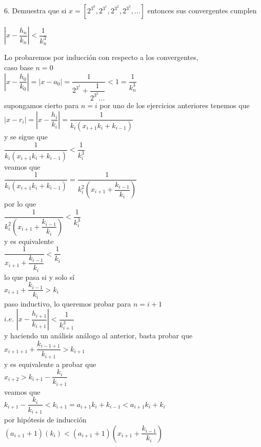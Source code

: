 \documentclass[11pt, article]{memoir}
\begin{document}
6. Demuestra que si $x=[2^{3^{0}},2^{3^{1}},2^{3^{2}},2^{3^{3}},...]$ entonces sus convergentes cumplen\\
\begin{center}
$\left|x-\dfrac{h_{n}}{k_{n}}\right|<\dfrac{1}{k_{n}^{3}}$\\
\end{center}

Lo probaremos por inducción con respecto a los convergentes,\\
caso base $n=0$\\
$\left|x-\dfrac{h_{0}}{k_{0}}\right|=\left|x-a_{0}\right|=\dfrac{1}{2^{3^{1}}+\dfrac{1}{2^{3^{2}}...}}<1=\dfrac{1}{k_{n}^{3}}$\\
supongamos cierto para $n=i$  
por uno de los ejercicios anteriores tenemos que $\left|x-r_{i}\right|=\left|x-\dfrac{h_{i}}{k_{i}}\right|=\dfrac{1}{k_{i}(x_{i+1}k_{i}+k_{i-1})}$\\
y se sigue que\\
$\dfrac{1}{k_{i}(x_{i+1}k_{i}+k_{i-1})}<\dfrac{1}{k_{i}^{3}}$\\
veamos que\\
$\dfrac{1}{k_{i}(x_{i+1}k_{i}+k_{i-1})}=\dfrac{1}{k_{i}^{2}(x_{i+1}+\dfrac{k_{i-1}}{k_{i}})}$\\
por lo que\\
$\dfrac{1}{k_{i}^{2}(x_{i+1}+\dfrac{k_{i-1}}{k_{i}})}<\dfrac{1}{k_{i}^{3}}$\\
y es equivalente\\
$\dfrac{1}{x_{i+1}+\dfrac{k_{i-1}}{k_{i}}}<\dfrac{1}{k_{i}}$\\
lo que pasa si y solo sí\\
$x_{i+1}+\dfrac{k_{i-1}}{k_{i}}>k_{i}$\\
paso inductivo, lo queremos probar para $n=i+1$\\
$i.e.$  $\left|x-\dfrac{h_{i+1}}{k_{i+1}}\right|<\dfrac{1}{k_{i+1}^{3}}$\\
y haciendo un análisis análogo al anterior, basta probar que\\
$x_{i+1+1}+\dfrac{k_{i-1+1}}{k_{i+1}}>k_{i+1}$\\
y es equivalente a probar que\\
$x_{i+2}>k_{i+1}-\dfrac{k_{i}}{k_{i+1}}$\\
veamos que\\
$k_{i+1}-\dfrac{k_{i}}{k_{i+1}}<k_{i+1}=a_{i+1}k_{i}+k_{i-1}<a_{i+1}k_{i}+k_{i}$\\
por hipótesis de inducción\\
$(a_{i+1}+1)(k_{i})<(a_{i+1}+1)(x_{i+1}+\dfrac{k_{i-1}}{k_{i}})$\\
\end{document}
